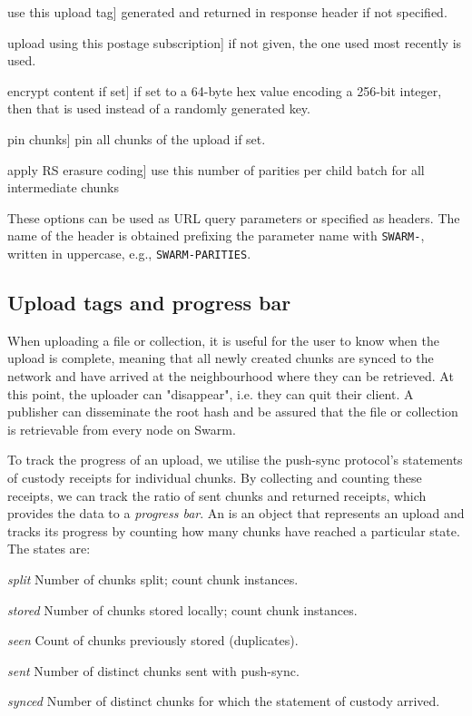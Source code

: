 \begin{labelledlist}
\item[\lstinline{tag}] use this upload tag] generated and returned in response header if not specified. 
\item[\lstinline{stamp}] upload using this postage subscription] if not given, the one used most recently is used. 
\item[\lstinline{encryption}] encrypt content if set] if set to a 64-byte hex value encoding a 256-bit integer, then that is used instead of a randomly generated key. 
\item[\lstinline{pin}] pin chunks] pin all chunks of the upload if set. 
\item[\lstinline{parities}] apply RS erasure coding]  use this number of parities per child batch for all intermediate chunks
\end{labelledlist}

These options can be used as URL query parameters or specified as  headers. The name of the header is obtained prefixing the parameter name with \lstinline{SWARM-}, written in uppercase, e.g., \lstinline{SWARM-PARITIES}.  


\subsection{Upload tags and progress bar \statusgreen}\label{sec:tags}                                                                                        
When uploading a file or collection, it is useful for the user to know when the upload is complete, meaning that all newly created chunks are synced to the network and have arrived at the neighbourhood where they can be retrieved. At this point, the uploader can "disappear", i.e. they can quit their client. A publisher can disseminate the root hash and be assured that the file or collection is retrievable from every node on Swarm. 

To track the progress of an upload, we utilise the push-sync protocol's statements of custody receipts for individual chunks. By collecting and counting these receipts, we can track the ratio of sent chunks and returned receipts, which provides the data to a \emph{progress bar}. An  is an object that represents an upload and tracks its progress by counting how many chunks have reached a particular state. The states are: 

\begin{labelledlist}
\item[\emph{split}] Number of chunks split; count chunk instances.
\item[\emph{stored}] Number of chunks stored locally; count chunk instances.
\item[\emph{seen}] Count of chunks previously stored (duplicates).
\item[\emph{sent}] Number of distinct chunks sent with push-sync.
\item[\emph{synced}] Number of distinct chunks for which the statement of custody arrived.
\end{labelledlist}

